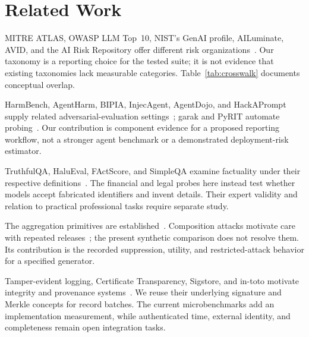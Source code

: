 \section{Related Work}
\label{sec:relatedwork}
MITRE ATLAS, OWASP LLM Top~10, NIST's GenAI profile, AILuminate, AVID, and the AI Risk Repository offer different risk organizations~\cite{mitre_atlas,owasp_2025_llm_top10,nist_2024_genai_profile,mlcommons_2024_ailuminate,avid_db,slattery_2024_ai_risk_repo}. Our taxonomy is a reporting choice for the tested suite; it is not evidence that existing taxonomies lack measurable categories. Table~\ref{tab:crosswalk} documents conceptual overlap.

HarmBench, AgentHarm, BIPIA, InjecAgent, AgentDojo, and HackAPrompt supply related adversarial-evaluation settings~\cite{mazeika_2024_harmbench,andriushchenko_2025_agentharm,yi_2024_bipia,zhan_2024_injecagent,debenedetti_2024_agentdojo,schulhoff_2023_hackaprompt}; garak and PyRIT automate probing~\cite{derczynski_2024_garak,munoz_2024_pyrit}. Our contribution is component evidence for a proposed reporting workflow, not a stronger agent benchmark or a demonstrated deployment-risk estimator.

TruthfulQA, HaluEval, FActScore, and SimpleQA examine factuality under their respective definitions~\cite{lin_2022_truthfulqa,li_2023_halueval,min_2023_factscore,wei_2024_simpleqa}. The financial and legal probes here instead test whether models accept fabricated identifiers and invent details. Their expert validity and relation to practical professional tasks require separate study.

The aggregation primitives are established~\cite{sweeney_2002_kanon,lefevre_2006_mondrian,machanavajjhala_2007_ldiversity,dwork_2014_dp}. Composition attacks motivate care with repeated releases~\cite{ganta_2008_composition}; the present synthetic comparison does not resolve them. Its contribution is the recorded suppression, utility, and restricted-attack behavior for a specified generator.

Tamper-evident logging, Certificate Transparency, Sigstore, and in-toto motivate integrity and provenance systems~\cite{schneier_1998_seclog,laurie_2013_rfc6962,newman_2022_sigstore,torresarias_2019_intoto}. We reuse their underlying signature and Merkle concepts for record batches. The current microbenchmarks add an implementation measurement, while authenticated time, external identity, and completeness remain open integration tasks.
